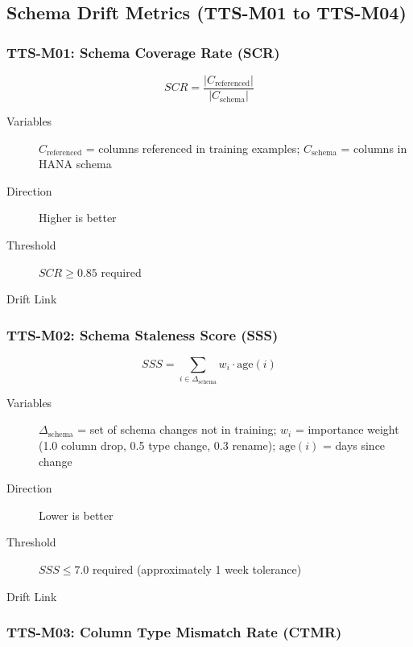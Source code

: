 \subsection{Schema Drift Metrics (TTS-M01 to TTS-M04)}

\subsubsection{TTS-M01: Schema Coverage Rate (SCR)}

\begin{equation}
\boxed{
SCR = \frac{|C_{\text{referenced}}|}{|C_{\text{schema}}|}
}
\end{equation}

\begin{description}
  \item[Variables] $C_{\text{referenced}}$ = columns referenced in training examples;
        $C_{\text{schema}}$ = columns in HANA schema
  \item[Direction] Higher is better
  \item[Threshold] $SCR \geq 0.85$ required
  \item[Drift Link] 
\end{description}

\subsubsection{TTS-M02: Schema Staleness Score (SSS)}

\begin{equation}
\boxed{
SSS = \sum_{i \in \Delta_{\text{schema}}} w_i \cdot \text{age}(i)
}
\end{equation}

\begin{description}
  \item[Variables] $\Delta_{\text{schema}}$ = set of schema changes not in training;
        $w_i$ = importance weight (1.0 column drop, 0.5 type change, 0.3 rename);
        $\text{age}(i)$ = days since change
  \item[Direction] Lower is better
  \item[Threshold] $SSS \leq 7.0$ required (approximately 1 week tolerance)
  \item[Drift Link] 
\end{description}

\subsubsection{TTS-M03: Column Type Mismatch Rate (CTMR)}

